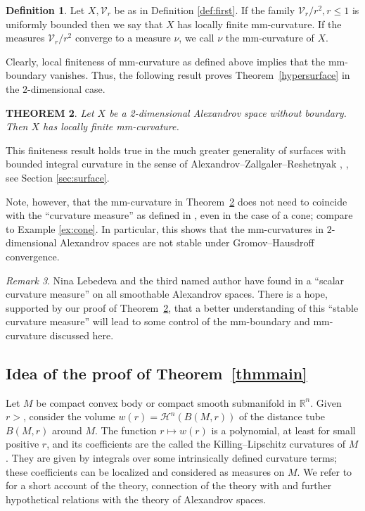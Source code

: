 \documentclass[12pt,leqno,intlimits]{amsart}
\numberwithin{equation}{section}
\newtheorem{thm}{THEOREM}[section]
\theoremstyle{definition}
\newtheorem{defn}[thm]{Definition}%
\theoremstyle{remark}
\newtheorem{rem}[thm]{Remark}
\newcommand{\tref}[1]{Theorem~\ref{#1}}
\newcommand{\R}{\mathbb{R}}
\begin{document}
\begin{defn}
Let $X,\mathcal{V}_r$ be as in Definition \ref{def:first}.
If the family $\mathcal{V}_r /r^2, r\leq 1$ is uniformly bounded then we say that $X$ has locally finite mm-curvature.
If the measures $\mathcal{V}_r /r^2$ converge to a measure $\nu$, we call $\nu$ the mm-curvature of $X$.
\end{defn}

Clearly, local finiteness of mm-curvature as defined above implies that the mm-boundary vanishes.
Thus, the following result proves \tref{hypersurface} in the $2$-dimensional case.

\begin{thm} \label{intsurface}
Let $X$ be a 2-dimensional Alexandrov space without boundary.
Then $X$ has locally finite mm-curvature.
\end{thm}

This finiteness result holds true in the much greater generality of surfaces with bounded integral curvature in the sense of Alexandrov--Zallgaler--Reshetnyak \cite{Reshetnyak-GeomIV}, \cite{AZ}, see Section \ref{sec:surface}.

Note, however, that the mm-curvature
in \tref{intsurface} does not need to coincide with the ``curvature measure'' as defined in \cite{AZ}, even in the case of a cone; compare to Example \ref{ex:cone}.
In particular, this shows that the mm-curvatures in $2$-dimensional Alexandrov spaces are not stable under Gromov--Hausdroff convergence.

\begin{rem}
Nina Lebedeva and the third named author have found in \cite{LP} a ``scalar curvature measure'' on all smoothable Alexandrov spaces.
There is a hope, supported by our proof of \tref{intsurface}, that a better understanding of this ``stable curvature measure'' will
lead to some control of the mm-boundary and mm-curvature discussed here.
\end{rem}

\subsection{Idea of the proof of \tref{thmmain}}
Let $M$ be compact convex body or compact smooth submanifold in $\R^n$.
Given $r>$, consider the volume $w(r)=\mathcal H^n (B(M,r))$ of the distance tube $B(M,r)$ around $M$.
The function $r\mapsto w(r)$ is a polynomial, at least for small positive $r$, and its coefficients are the called the Killing--Lipschitz curvatures of $M$.
They are given by integrals over some intrinsically defined curvature terms;
these coefficients can be localized and considered as measures on $M$.
We refer to \cite{Alesker} for a short account of the theory, connection of the theory with
\cite{LP} and further hypothetical relations with the theory of Alexandrov spaces.
\end{document}
